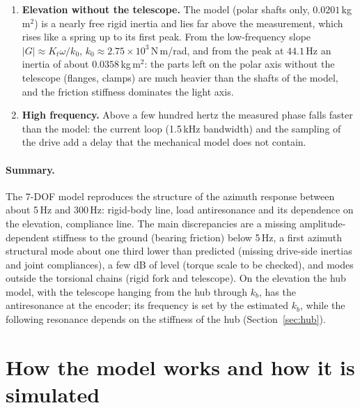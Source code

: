 \documentclass[10pt,a4paper]{article}
\numberwithin{equation}{section}
\begin{document}
\begin{enumerate}
\item \textbf{Elevation without the telescope.} The model (polar shafts only, $0.0201$\,kg\,m$^2$) is a nearly free rigid inertia and lies far above the measurement, which rises like a spring up to its first peak. From the low-frequency slope $|G| \approx K_t\omega/k_0$, $k_0 \approx 2.75\times10^{3}$\,N\,m/rad, and from the peak at $44.1$\,Hz an inertia of about $0.0358$\,kg\,m$^2$: the parts left on the polar axis without the telescope (flanges, clamps) are much heavier than the shafts of the model, and the friction stiffness dominates the light axis.
\item \textbf{High frequency.} Above a few hundred hertz the measured phase falls faster than the model: the current loop (1.5\,kHz bandwidth) and the sampling of the drive add a delay that the mechanical model does not contain.
\end{enumerate}

\paragraph{Summary.} The 7-DOF model reproduces the structure of the azimuth response between about 5\,Hz and 300\,Hz: rigid-body line, load antiresonance and its dependence on the elevation, compliance line. The main discrepancies are a missing amplitude-dependent stiffness to the ground (bearing friction) below 5\,Hz, a first azimuth structural mode about one third lower than predicted (missing drive-side inertias and joint compliances), a few dB of level (torque scale to be checked), and modes outside the torsional chains (rigid fork and telescope). On the elevation the hub model, with the telescope hanging from the hub through $k_b$, has the antiresonance at the encoder; its frequency is set by the estimated $k_b$, while the following resonance depends on the stiffness of the hub (Section~\ref{sec:hub}).
\section{How the model works and how it is simulated}\label{sec:workflow}
\end{document}
